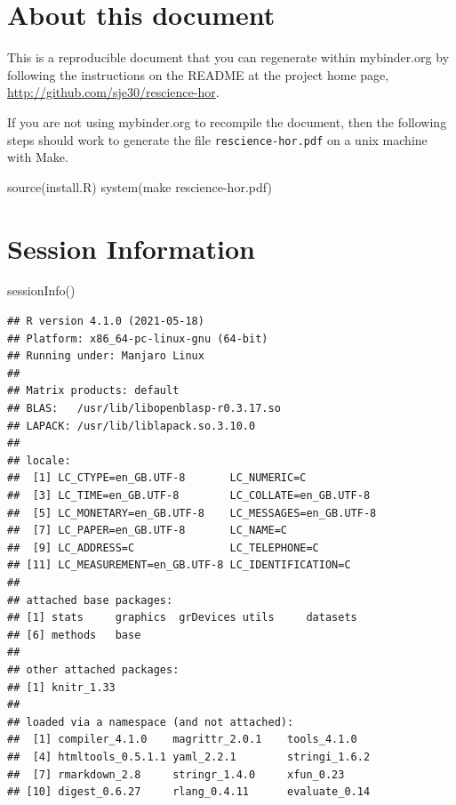 \documentclass[
]{article}
\newenvironment{Shaded}{\begin{snugshade}}{\end{snugshade}}
\newcommand{\FunctionTok}[1]{\textcolor[rgb]{0.00,0.00,0.00}{#1}}
\newcommand{\NormalTok}[1]{#1}
\newcommand{\StringTok}[1]{\textcolor[rgb]{0.31,0.60,0.02}{#1}}
\begin{document}
\hypertarget{about-this-document}{%
\section{About this document}\label{about-this-document}}

This is a reproducible document that you can regenerate within
mybinder.org by following the instructions on the README at the project
home page, \url{http://github.com/sje30/rescience-hor}.

If you are not using mybinder.org to recompile the document, then the
following steps should work to generate the file
\texttt{rescience-hor.pdf} on a unix machine with Make.

\begin{Shaded}
\begin{Highlighting}[]
\FunctionTok{source}\NormalTok{(}\StringTok{\textquotesingle{}install.R\textquotesingle{}}\NormalTok{)}
\FunctionTok{system}\NormalTok{(}\StringTok{\textquotesingle{}make rescience{-}hor.pdf\textquotesingle{}}\NormalTok{)}
\end{Highlighting}
\end{Shaded}

\clearpage

\hypertarget{session-information}{%
\section{Session Information}\label{session-information}}

\begin{Shaded}
\begin{Highlighting}[]
\FunctionTok{sessionInfo}\NormalTok{()}
\end{Highlighting}
\end{Shaded}

\begin{verbatim}
## R version 4.1.0 (2021-05-18)
## Platform: x86_64-pc-linux-gnu (64-bit)
## Running under: Manjaro Linux
## 
## Matrix products: default
## BLAS:   /usr/lib/libopenblasp-r0.3.17.so
## LAPACK: /usr/lib/liblapack.so.3.10.0
## 
## locale:
##  [1] LC_CTYPE=en_GB.UTF-8       LC_NUMERIC=C              
##  [3] LC_TIME=en_GB.UTF-8        LC_COLLATE=en_GB.UTF-8    
##  [5] LC_MONETARY=en_GB.UTF-8    LC_MESSAGES=en_GB.UTF-8   
##  [7] LC_PAPER=en_GB.UTF-8       LC_NAME=C                 
##  [9] LC_ADDRESS=C               LC_TELEPHONE=C            
## [11] LC_MEASUREMENT=en_GB.UTF-8 LC_IDENTIFICATION=C       
## 
## attached base packages:
## [1] stats     graphics  grDevices utils     datasets 
## [6] methods   base     
## 
## other attached packages:
## [1] knitr_1.33
## 
## loaded via a namespace (and not attached):
##  [1] compiler_4.1.0    magrittr_2.0.1    tools_4.1.0      
##  [4] htmltools_0.5.1.1 yaml_2.2.1        stringi_1.6.2    
##  [7] rmarkdown_2.8     stringr_1.4.0     xfun_0.23        
## [10] digest_0.6.27     rlang_0.4.11      evaluate_0.14
\end{verbatim}
\end{document}
